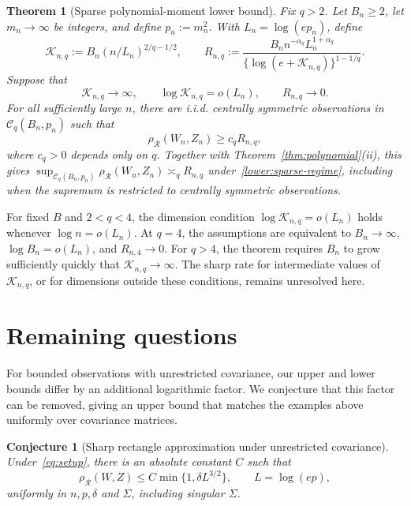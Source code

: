 \documentclass[11pt,letterpaper]{article}
\newtheorem{theorem}{Theorem}
\newtheorem{conjecture}{Conjecture}
\theoremstyle{remark}
\newcommand{\rh}{\rho_{\mathcal R}}
\begin{document}
\begin{theorem}[Sparse polynomial-moment lower bound]\label{lower:sparse}
Fix \(q>2\). Let \(B_n\ge2\), let \(m_n\to\infty\) be integers,
and {define} \(p_n:=m_n^2\). With \(L_n=\log(ep_n)\), define
\[
 \mathcal K_{n,q}:=B_n(n/L_n)^{2/q-1/2},\qquad
 R_{n,q}:=\frac{B_n n^{-\alpha_q}L_n^{1+\alpha_q}}
                    {\{\log(e+\mathcal K_{n,q})\}^{1-1/q}}.
\]
Suppose that
\begin{equation}
 \mathcal K_{n,q}\longrightarrow\infty,\qquad
 \log\mathcal K_{n,q}=o(L_n),\qquad R_{n,q}\longrightarrow0.
 \label{lower:sparse-regime}
\end{equation}
For all sufficiently large \(n\), there are i.i.d. centrally symmetric
observations in \(\mathcal C_q(B_n,p_n)\) such that
\begin{equation}
 \rh(W_n,Z_n)\ge c_qR_{n,q},
 \label{lower:sparse-rate}
\end{equation}
where \(c_q>0\) depends only on \(q\).
Together with {Theorem~\ref{thm:polynomial}\textup{(ii)}}, this gives
\(\sup_{\mathcal C_q(B_n,p_n)}\rh(W_n,Z_n)\asymp_q R_{n,q}\)
under~\eqref{lower:sparse-regime}, including when the supremum is
restricted to centrally symmetric observations.
\end{theorem}

For fixed \(B\) and \(2<q<4\), the dimension condition
\(\log\mathcal K_{n,q}=o(L_n)\) holds whenever
\(\log n=o(L_n)\). At \(q=4\), the assumptions are equivalent to
\(B_n\to\infty\), \(\log B_n=o(L_n)\), and \(R_{n,4}\to0\).
For \(q>4\), the theorem requires \(B_n\) to grow sufficiently quickly
that \(\mathcal K_{n,q}\to\infty\).
The sharp rate for intermediate values of \(\mathcal K_{n,q}\), or
for dimensions outside these conditions, remains unresolved here.

\section{Remaining questions}\label{sec:discussion}

For bounded observations with unrestricted covariance, our upper and
lower bounds differ by an additional logarithmic factor. We conjecture
that this factor can be removed, giving an upper bound that matches
the examples above uniformly over covariance matrices.
\begin{conjecture}[Sharp rectangle approximation under unrestricted covariance]
\label{conj:sharp-unrestricted}
Under~\eqref{eq:setup}, there is an absolute constant \(C\) such that
\[
 \rh(W,Z)\le C\min\{1,\delta L^{3/2}\},\qquad L=\log(ep),
\]
uniformly in \(n,p,\delta\) and \(\Sigma\), including singular \(\Sigma\).
\end{conjecture}
\end{document}
